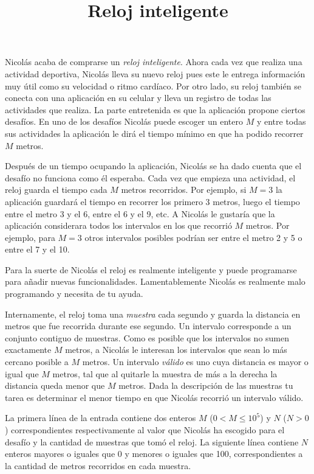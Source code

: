 \documentclass{oci}
\title{Reloj inteligente}
\begin{document}
\begin{problemDescription}
  Nicolás acaba de comprarse un \emph{reloj inteligente}.
  Ahora cada vez que realiza una actividad deportiva, Nicolás lleva su nuevo
  reloj pues este le entrega información muy útil como su velocidad o ritmo
  cardíaco.
  Por otro lado, su reloj también se conecta con una aplicación en su celular y
  lleva un registro de todas las actividades que realiza.
  La parte entretenida es que la aplicación propone ciertos desafíos.
  En uno de los desafíos Nicolás puede escoger un entero $M$ y entre todas sus
  actividades la aplicación le dirá el tiempo mínimo en que ha podido recorrer
  $M$ metros.

  Después de un tiempo ocupando la aplicación, Nicolás se ha dado cuenta que el
  desafío no funciona como él esperaba.
  Cada vez que empieza una actividad, el reloj guarda el tiempo cada $M$
  metros recorridos.
  Por ejemplo, si $M=3$ la aplicación guardará el tiempo en
  recorrer los primero 3 metros, luego el tiempo entre el metro 3 y
  el 6, entre el 6 y el 9, etc.
  A Nicolás le gustaría que la aplicación considerara todos los intervalos en
  los que recorrió $M$ metros.
  Por ejemplo, para $M=3$ otros intervalos posibles podrían ser entre el
  metro 2 y 5 o entre el 7 y el 10.

  Para la suerte de Nicolás el reloj es realmente inteligente y puede
  programarse para añadir nuevas funcionalidades.
  Lamentablemente Nicolás es realmente malo programando y necesita de tu ayuda.

  Internamente, el reloj toma una \emph{muestra} cada segundo y guarda la
  distancia en metros que fue recorrida durante ese segundo.
  Un intervalo corresponde a un conjunto contiguo de muestras.
  Como es posible que los intervalos no sumen exactamente $M$ metros, a
  Nicolás le interesan los intervalos que sean lo más cercano posible a $M$
  metros.
  Un intervalo \emph{válido} es uno cuya distancia es mayor o igual que $M$ metros,
  tal que al quitarle la muestra de más a la derecha la distancia queda menor
  que $M$ metros.
  Dada la descripción de las muestras tu tarea es determinar el menor tiempo en
  que Nicolás recorrió un intervalo válido.
\end{problemDescription}

\begin{inputDescription}
  La primera línea de la entrada contiene dos enteros $M$ ($0<M\leq 10^5$) y $N$
  ($N > 0$) correspondientes respectivamente al valor que Nicolás ha escogido
  para el desafío y la cantidad de muestras que tomó el reloj.
  La siguiente línea contiene $N$ enteros mayores o iguales que 0 y menores o
  iguales que 100, correspondientes a la cantidad de metros recorridos en cada
  muestra.
\end{inputDescription}
\end{document}
